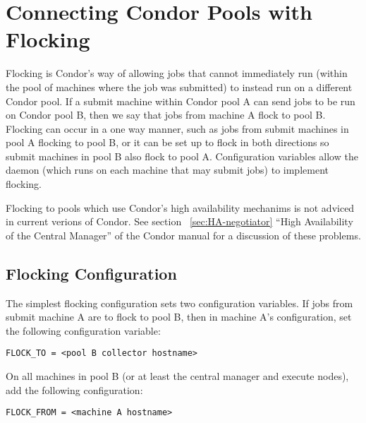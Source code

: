 \section{\label{sec:Flocking}Connecting Condor Pools with Flocking}

Flocking is Condor's way of allowing jobs that cannot immediately
run (within the pool of machines where the job was
submitted) to instead run on a different Condor pool. 
If a submit machine within Condor pool A can send jobs to be run on Condor pool B,
then we say that jobs from machine A flock to pool B.
Flocking can occur in a one way manner,
such as jobs from submit machines in pool A flocking to pool B,
or it can be set up to flock in both directions so submit machines
in pool B also flock to pool A. 
Configuration variables allow the
 daemon (which runs on each machine
that may submit jobs) to implement flocking.

\Note Flocking to pools which use Condor's high availability mechanims
is not adviced in current verions of Condor.  See section
~\ref{sec:HA-negotiator} ``High Availability of the Central Manager''
of the Condor manual for a discussion of these problems.


\subsection{\label{sec:Configure-Flocking}Flocking Configuration}

The simplest flocking configuration sets
two configuration variables.
If jobs from submit machine A are to flock to pool B, 
then in machine A's configuration,
set the following configuration variable:

\begin{verbatim}
FLOCK_TO = <pool B collector hostname>
\end{verbatim}

On all machines in pool B (or at least the central manager and execute nodes),
add the following configuration:

\begin{verbatim}
FLOCK_FROM = <machine A hostname>
\end{verbatim}

